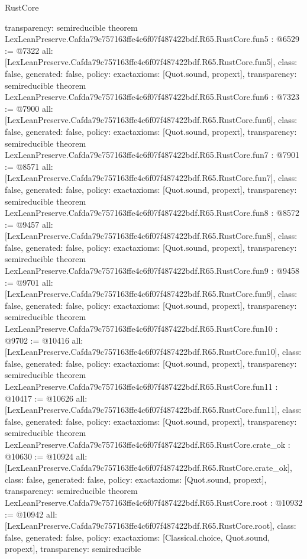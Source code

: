 \begin{lexlean}{RustCore}
\begin{coremodule}
{  transparency: semireducible
}
theorem LexLeanPreserve.Cafda79c757163ffe4c6f07f487422bdf.R65.RustCore.fun5 : @6529 := @7322 {
  all: [LexLeanPreserve.Cafda79c757163ffe4c6f07f487422bdf.R65.RustCore.fun5],
  class: false,
  generated: false,
  policy: exact{axioms: [Quot.sound, propext]},
  transparency: semireducible
}
theorem LexLeanPreserve.Cafda79c757163ffe4c6f07f487422bdf.R65.RustCore.fun6 : @7323 := @7900 {
  all: [LexLeanPreserve.Cafda79c757163ffe4c6f07f487422bdf.R65.RustCore.fun6],
  class: false,
  generated: false,
  policy: exact{axioms: [Quot.sound, propext]},
  transparency: semireducible
}
theorem LexLeanPreserve.Cafda79c757163ffe4c6f07f487422bdf.R65.RustCore.fun7 : @7901 := @8571 {
  all: [LexLeanPreserve.Cafda79c757163ffe4c6f07f487422bdf.R65.RustCore.fun7],
  class: false,
  generated: false,
  policy: exact{axioms: [Quot.sound, propext]},
  transparency: semireducible
}
theorem LexLeanPreserve.Cafda79c757163ffe4c6f07f487422bdf.R65.RustCore.fun8 : @8572 := @9457 {
  all: [LexLeanPreserve.Cafda79c757163ffe4c6f07f487422bdf.R65.RustCore.fun8],
  class: false,
  generated: false,
  policy: exact{axioms: [Quot.sound, propext]},
  transparency: semireducible
}
theorem LexLeanPreserve.Cafda79c757163ffe4c6f07f487422bdf.R65.RustCore.fun9 : @9458 := @9701 {
  all: [LexLeanPreserve.Cafda79c757163ffe4c6f07f487422bdf.R65.RustCore.fun9],
  class: false,
  generated: false,
  policy: exact{axioms: [Quot.sound, propext]},
  transparency: semireducible
}
theorem LexLeanPreserve.Cafda79c757163ffe4c6f07f487422bdf.R65.RustCore.fun10 : @9702 := @10416 {
  all: [LexLeanPreserve.Cafda79c757163ffe4c6f07f487422bdf.R65.RustCore.fun10],
  class: false,
  generated: false,
  policy: exact{axioms: [Quot.sound, propext]},
  transparency: semireducible
}
theorem LexLeanPreserve.Cafda79c757163ffe4c6f07f487422bdf.R65.RustCore.fun11 : @10417 := @10626 {
  all: [LexLeanPreserve.Cafda79c757163ffe4c6f07f487422bdf.R65.RustCore.fun11],
  class: false,
  generated: false,
  policy: exact{axioms: [Quot.sound, propext]},
  transparency: semireducible
}
theorem LexLeanPreserve.Cafda79c757163ffe4c6f07f487422bdf.R65.RustCore.crate_ok : @10630 := @10924 {
  all: [LexLeanPreserve.Cafda79c757163ffe4c6f07f487422bdf.R65.RustCore.crate_ok],
  class: false,
  generated: false,
  policy: exact{axioms: [Quot.sound, propext]},
  transparency: semireducible
}
theorem LexLeanPreserve.Cafda79c757163ffe4c6f07f487422bdf.R65.RustCore.root : @10932 := @10942 {
  all: [LexLeanPreserve.Cafda79c757163ffe4c6f07f487422bdf.R65.RustCore.root],
  class: false,
  generated: false,
  policy: exact{axioms: [Classical.choice, Quot.sound, propext]},
  transparency: semireducible
}


\end{coremodule}
\end{lexlean}
